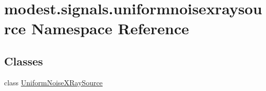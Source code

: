 \hypertarget{namespacemodest_1_1signals_1_1uniformnoisexraysource}{}\section{modest.\+signals.\+uniformnoisexraysource Namespace Reference}
\label{namespacemodest_1_1signals_1_1uniformnoisexraysource}
\subsection*{Classes}
\begin{DoxyCompactItemize}
\item 
class \hyperlink{classmodest_1_1signals_1_1uniformnoisexraysource_1_1UniformNoiseXRaySource}{Uniform\+Noise\+X\+Ray\+Source}
\end{DoxyCompactItemize}
